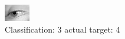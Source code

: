 \begin{figure}[h!]
\begin{center}
\includegraphics[width=0.60\columnwidth]{figures/ID3009_class_3_target_4.png}
\end{center}
\caption{ Classification: 3 actual target: 4}
\label{fig:ID3009_class_3_target_4}
\end{figure}
